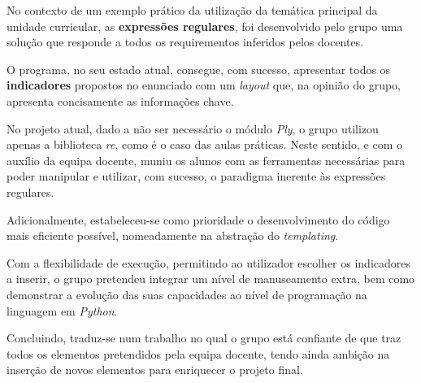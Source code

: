 No contexto de um exemplo prático da utilização da temática principal da 
unidade curricular, as \textbf{expressões regulares}, foi desenvolvido pelo grupo 
uma solução que responde a todos os requirementos inferidos pelos docentes.

O programa, no seu estado atual, consegue, com sucesso, apresentar todos os \textbf{indicadores}
propostos no enunciado com um \textit{layout} que, na opinião do grupo, apresenta concisamente
as informações chave.

No projeto atual, dado a não ser necessário o módulo \textit{Ply}, o grupo utilizou apenas 
a biblioteca \textit{re}, como é o caso das aulas práticas.
Neste sentido, e com o auxílio da equipa docente, muniu os alunos com as ferramentas 
necessárias para poder manipular e utilizar, com sucesso, o paradigma inerente às expressões regulares.

Adicionalmente, estabeleceu-se como prioridade o desenvolvimento do código mais eficiente possível,
nomeadamente na abstração do \textit{templating}.

Com a flexibilidade de execução, permitindo ao utilizador escolher os indicadores a inserir, o 
grupo pretendeu integrar um nível de manuseamento extra, bem como demonstrar a evolução das 
suas capacidades ao nível de programação na linguagem em \textit{Python}.

Concluindo, traduz-se num trabalho no qual o grupo está confiante de que traz todos os elementos 
pretendidos pela equipa docente, tendo ainda ambição na inserção de novos elementos para enriquecer
o projeto final.
